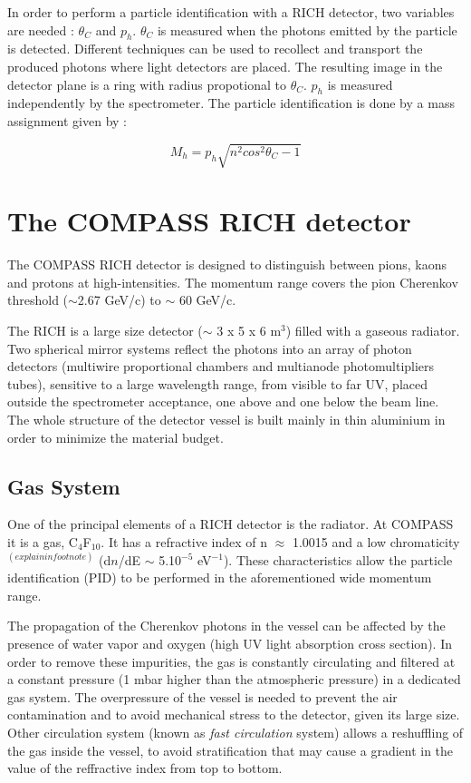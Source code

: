 In order to perform a particle identification with a RICH detector, two variables are needed : $\theta_C$ and $p_h$. $\theta_C$ is
measured when the photons emitted by the particle is detected. Different techniques can be used to recollect and transport the produced
photons where light detectors are placed. The resulting image in the detector plane is a ring with radius propotional to $\theta_C$.
$p_h$ is measured independently by the spectrometer. The particle identification is done by a mass assignment given by :

\begin{equation}
  M_h = p_h \sqrt{n^2 cos^2 \theta_C -1}
\end{equation}


\section{The COMPASS RICH detector}

The COMPASS RICH detector is designed to distinguish between pions, kaons and protons at high-intensities. The momentum range covers the
pion Cherenkov threshold ($\sim$2.67 GeV/c) to $\sim$ 60 GeV/c.

The RICH is a large size detector ($\sim$ 3 x 5 x 6 m$^3$) filled with a gaseous radiator. Two spherical mirror systems reflect the photons
into an array of photon detectors (multiwire proportional chambers and multianode photomultipliers tubes), sensitive to a large wavelength
range, from visible to far UV, placed outside the spectrometer acceptance, one above and one below the beam line. The whole structure of the
detector vessel is built mainly in thin aluminium in order to minimize the material budget.

\subsection*{Gas System}

One of the principal elements of a RICH detector is the radiator. At COMPASS it is a gas, C$_4$F$_10$. It has a refractive index of n $\approx$
1.0015 and a low chromaticity$^(explain in footnote)$ (d$n$/dE $\sim$ 5.10$^{-5}$ eV$^{-1}$). These characteristics allow the particle identification
(PID) to be performed in the aforementioned wide momentum range.

The propagation of the Cherenkov photons in the vessel can be affected by the presence of water vapor and oxygen (high UV light absorption cross section).
In order to remove these impurities, the gas is constantly circulating and filtered at a constant pressure (1 mbar higher than the atmospheric pressure)
in a dedicated gas system\cite{}. The overpressure of the vessel is needed to prevent the air contamination and to avoid mechanical stress to the detector,
given its large size. Other circulation system (known as \textit{fast circulation} system) allows a reshuffling of the gas inside the vessel, to avoid
stratification that may cause a gradient in the value of the reffractive index from top to bottom.

